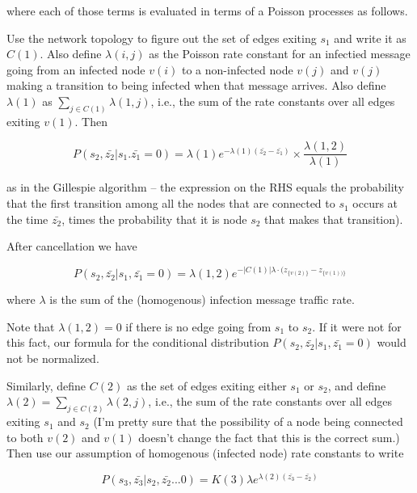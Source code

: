 \documentclass{article}
\begin{document}
where each of those terms is evaluated in terms of a Poisson processes as follows.  


        Use the network topology to figure out the set of edges exiting
	$s_1$ and write it as $C(1)$. Also define $\lambda(i,j)$ as the Poisson rate
	constant for an infectied message going from an infected node $v(i)$ 
        to a non-infected node $v(j)$ and $v(j)$ making a transition to being infected when 
        that message arrives.  Also define $\lambda(1)$ as $\sum_{j \in C(1)} \lambda(1,j)$,
	i.e., the sum of the rate constants over all edges exiting $v(1)$. Then

\begin{equation}
P(s_2, \bar{z_2} | s_1. \bar{z_1} =0)  =
\lambda(1) e^{- \lambda(1) (\bar{z_2} - \bar{z_1})} 
\times \frac{\lambda(1,2)}{\lambda(1)}
\end{equation}

        as in the Gillespie algorithm -- the
	expression on the RHS equals the probability that the first transition
	among all the nodes that are connected to $s_1$ occurs at the time
	$\bar{z_2}$, times the probability that it is node $s_2$ that makes that
	transition). 
        
          
After cancellation we have	

\begin{equation}
P(s_2, \bar{z_2} | s_1, \bar{z_1} = 0) =
\lambda(1, 2) e^{-|C(1)| \lambda \cdot (z_{\{v(2)\}} - z_{\{v(1))\}}}
\label{orig5}
\end{equation}

	where $\lambda$ is the sum of the (homogenous) infection message traffic rate. 

	Note that $\lambda(1, 2) = 0$ if there is no edge going from $s_1$ to
	$s_2$. If it were not for this fact, our formula for the conditional
	distribution $P(s_2, \bar{z_2} | s_1, \bar{z_1} = 0)$ would not be
	normalized.

	Similarly, define $C(2)$ as the set of edges exiting either $s_1$ or
	$s_2$, and define $\lambda(2) = \sum_{j \in C(2)} \lambda(2,j)$, i.e., the
	sum of the rate constants over all edges exiting $s_1$ and $s_2$ (I'm pretty
	sure that the possibility of a node being connected to both $v(2)$ and
	$v(1)$ doesn't change the fact that this is the correct sum.)  Then use
	our assumption of homogenous (infected node) rate constants to write

\begin{equation}
P(s_3, \bar{z_3} | s_2, \bar{z_2} ...0)  =  
K(3) \lambda e^{\lambda(2) (\bar{z_3} - \bar{z_2})} 
\end{equation}
\end{document}
